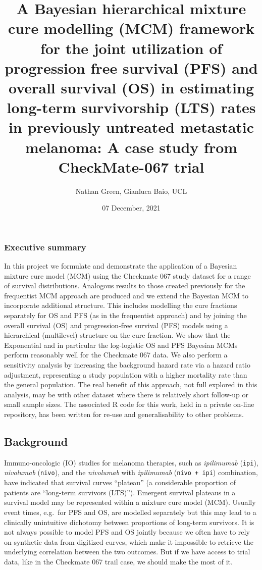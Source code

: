 \documentclass[
]{article}
\title{A Bayesian hierarchical mixture cure modelling (MCM) framework
for the joint utilization of progression free survival (PFS) and overall
survival (OS) in estimating long-term survivorship (LTS) rates in
previously untreated metastatic melanoma: A case study from
CheckMate-067 trial}
\author{Nathan Green, Gianluca Baio, UCL}
\date{07 December, 2021}
\begin{document}
\maketitle

\hypertarget{executive-summary}{%
\subsubsection{Executive summary}\label{executive-summary}}

In this project we formulate and demonstrate the application of a
Bayesian mixture cure model (MCM) using the Checkmate 067 study dataset
for a range of survival distributions. Analogous results to those
created previously for the frequentist MCM approach are produced and we
extend the Bayesian MCM to incorporate additional structure. This
includes modelling the cure fractions separately for OS and PFS (as in
the frequentist approach) and by joining the overall survival (OS) and
progression-free survival (PFS) models using a hierarchical (multilevel)
structure on the cure fraction. We show that the Exponential and in
particular the log-logistic OS and PFS Bayesian MCMs perform reasonably
well for the Checkmate 067 data. We also perform a sensitivity analysis
by increasing the background hazard rate via a hazard ratio adjustment,
representing a study population with a higher mortality rate than the
general population. The real benefit of this approach, not full explored
in this analysis, may be with other dataset where there is relatively
short follow-up or small sample sizes. The associated R code for this
work, held in a private on-line repository, has been written for re-use
and generalisability to other problems.

\hypertarget{background}{%
\subsection{Background}\label{background}}

Immuno-oncologic (IO) studies for melanoma therapies, such as
\emph{ipilimumab} (\texttt{ipi}), \emph{nivolumab} (\texttt{nivo}), and
the \emph{nivolumab} with \emph{ipilimumab} (\texttt{nivo\ +\ ipi})
combination, have indicated that survival curves ``plateau'' (a
considerable proportion of patients are ``long-term survivors (LTS)'').
Emergent survival plateaus in a survival model may be represented within
a mixture cure model (MCM). Usually event times, e.g.~for PFS and OS,
are modelled separately but this may lead to a clinically unintuitive
dichotomy between proportions of long-term survivors. It is not always
possible to model PFS and OS jointly because we often have to rely on
synthetic data from digitized curves, which make it impossible to
retrieve the underlying correlation between the two outcomes. But if we
have access to trial data, like in the Checkmate 067 trail case, we
should make the most of it.
\end{document}
